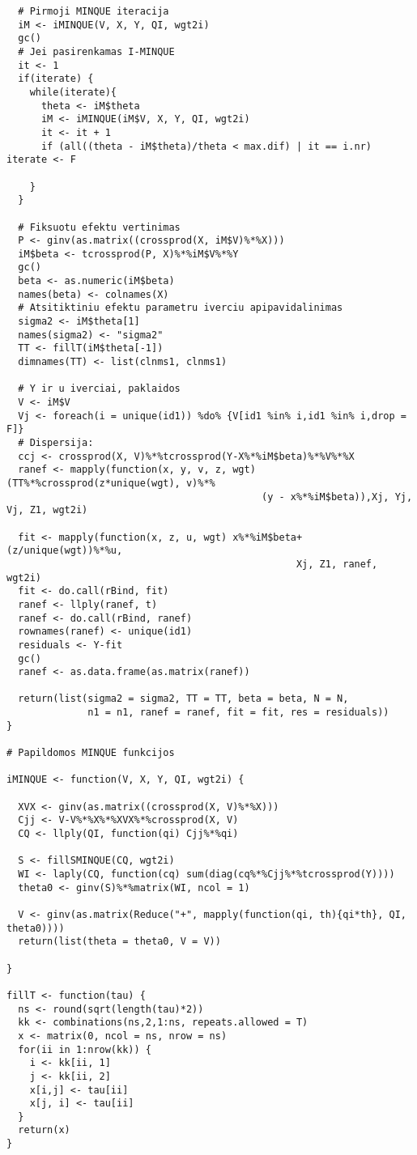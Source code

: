 \documentclass[11pt,a4paper]{article}
\begin{document}
\begin{appendix}
\begin{small}
\begin{verbatim}
  # Pirmoji MINQUE iteracija
  iM <- iMINQUE(V, X, Y, QI, wgt2i)
  gc()
  # Jei pasirenkamas I-MINQUE
  it <- 1
  if(iterate) {
    while(iterate){
      theta <- iM$theta
      iM <- iMINQUE(iM$V, X, Y, QI, wgt2i)
      it <- it + 1
      if (all((theta - iM$theta)/theta < max.dif) | it == i.nr) iterate <- F

    }
  }
  
  # Fiksuotu efektu vertinimas
  P <- ginv(as.matrix((crossprod(X, iM$V)%*%X)))
  iM$beta <- tcrossprod(P, X)%*%iM$V%*%Y
  gc()
  beta <- as.numeric(iM$beta)
  names(beta) <- colnames(X)
  # Atsitiktiniu efektu parametru iverciu apipavidalinimas
  sigma2 <- iM$theta[1]
  names(sigma2) <- "sigma2"
  TT <- fillT(iM$theta[-1])
  dimnames(TT) <- list(clnms1, clnms1)
  
  # Y ir u iverciai, paklaidos
  V <- iM$V
  Vj <- foreach(i = unique(id1)) %do% {V[id1 %in% i,id1 %in% i,drop = F]}
  # Dispersija:
  ccj <- crossprod(X, V)%*%tcrossprod(Y-X%*%iM$beta)%*%V%*%X
  ranef <- mapply(function(x, y, v, z, wgt) (TT%*%crossprod(z*unique(wgt), v)%*%
                                            (y - x%*%iM$beta)),Xj, Yj, Vj, Z1, wgt2i)
  
  fit <- mapply(function(x, z, u, wgt) x%*%iM$beta+(z/unique(wgt))%*%u, 
                                                  Xj, Z1, ranef, wgt2i)
  fit <- do.call(rBind, fit)
  ranef <- llply(ranef, t)
  ranef <- do.call(rBind, ranef)
  rownames(ranef) <- unique(id1)
  residuals <- Y-fit
  gc()
  ranef <- as.data.frame(as.matrix(ranef))

  return(list(sigma2 = sigma2, TT = TT, beta = beta, N = N, 
              n1 = n1, ranef = ranef, fit = fit, res = residuals))
}

# Papildomos MINQUE funkcijos

iMINQUE <- function(V, X, Y, QI, wgt2i) {
  
  XVX <- ginv(as.matrix((crossprod(X, V)%*%X)))
  Cjj <- V-V%*%X%*%XVX%*%crossprod(X, V)
  CQ <- llply(QI, function(qi) Cjj%*%qi)
  
  S <- fillSMINQUE(CQ, wgt2i)
  WI <- laply(CQ, function(cq) sum(diag(cq%*%Cjj%*%tcrossprod(Y))))
  theta0 <- ginv(S)%*%matrix(WI, ncol = 1)
  
  V <- ginv(as.matrix(Reduce("+", mapply(function(qi, th){qi*th}, QI, theta0))))
  return(list(theta = theta0, V = V))
  
}

fillT <- function(tau) {
  ns <- round(sqrt(length(tau)*2))
  kk <- combinations(ns,2,1:ns, repeats.allowed = T)
  x <- matrix(0, ncol = ns, nrow = ns)
  for(ii in 1:nrow(kk)) {
    i <- kk[ii, 1]
    j <- kk[ii, 2]
    x[i,j] <- tau[ii]
    x[j, i] <- tau[ii]
  }
  return(x)
}


\end{verbatim}
\end{small}
\end{appendix}
\end{document}
